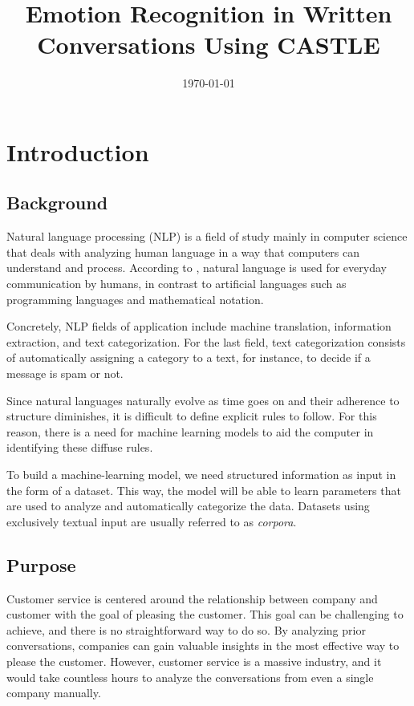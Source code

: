\documentclass[nofilelist]{cslthse-msc}
\title{Emotion Recognition in Written Conversations Using CASTLE}
\subtitle{\protect\icon{CASTLE}}
\date{\today}
\begin{document}
\renewcommand{\bibname}{References}

\makefrontmatter
\chapter{Introduction}


\section{Background}

Natural language processing (NLP) is a field of study mainly in computer science that deals with analyzing human language in a way that computers can understand and process. According to \citet{ntlk2009}, natural language is used for everyday communication by humans, in contrast to artificial languages such as programming languages and mathematical notation. 

Concretely, NLP fields of application include machine translation, information extraction, and text categorization. For the last field, text categorization consists of automatically assigning a category to a text, for instance, to decide if a message is spam or not.

Since natural languages naturally evolve as time goes on and their adherence to structure diminishes, it is difficult to define explicit rules to follow. For this reason, there is a need for machine learning models to aid the computer in identifying these diffuse rules. 

To build a machine-learning model, we need structured information as input in the form of a dataset. This way, the model will be able to learn parameters that are used to analyze and automatically categorize the data. Datasets using exclusively textual input are usually referred to as \textit{corpora}. 


\section{Purpose}
Customer service is centered around the relationship between company and customer with the goal of pleasing the customer. This goal can be challenging to achieve, and there is no straightforward way to do so. By analyzing prior conversations, companies can gain valuable insights in the most effective way to please the customer. However, customer service is a massive industry, and it would take countless hours to analyze the conversations from even a single company manually. 
\end{document}
